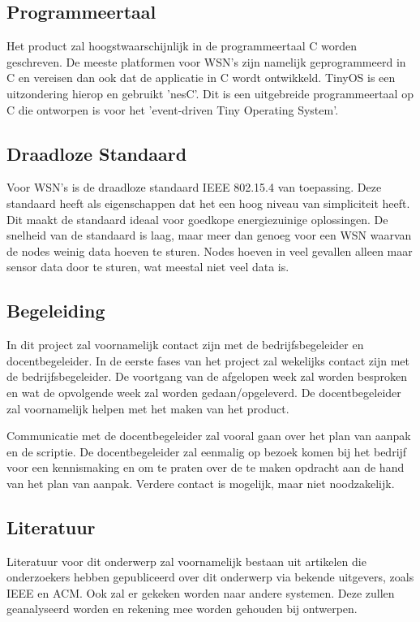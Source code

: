 \documentclass{../local}
\begin{document}
\subsection{Programmeertaal}
Het product zal hoogstwaarschijnlijk in de programmeertaal C worden geschreven. De meeste platformen voor WSN's zijn namelijk geprogrammeerd in C en vereisen dan ook dat de applicatie in C wordt ontwikkeld. TinyOS is een uitzondering hierop en gebruikt 'nesC'. Dit is een uitgebreide programmeertaal op C die ontworpen is voor het 'event-driven Tiny Operating System'.\cite{nesC}

\subsection{Draadloze Standaard}
Voor WSN's is de draadloze standaard IEEE 802.15.4 van toepassing. Deze standaard heeft als eigenschappen dat het een hoog niveau van simpliciteit heeft. Dit maakt de standaard ideaal voor goedkope energiezuinige oplossingen. De snelheid van de standaard is laag, maar meer dan genoeg voor een WSN waarvan de nodes weinig data hoeven te sturen. Nodes hoeven in veel gevallen alleen maar sensor data door te sturen, wat meestal niet veel data is.

\subsection{Begeleiding}
In dit project zal voornamelijk contact zijn met de bedrijfsbegeleider en docentbegeleider. In de eerste fases van het project zal wekelijks contact zijn met de bedrijfsbegeleider. De voortgang van de afgelopen week zal worden besproken en wat de opvolgende week zal worden gedaan/opgeleverd. De docentbegeleider zal voornamelijk helpen met het maken van het product.

Communicatie met de docentbegeleider zal vooral gaan over het plan van aanpak en de scriptie. De docentbegeleider zal eenmalig op bezoek komen bij het bedrijf voor een kennismaking en om te praten over de te maken opdracht aan de hand van het plan van aanpak. Verdere contact is mogelijk, maar niet noodzakelijk.

\subsection{Literatuur}
Literatuur voor dit onderwerp zal voornamelijk bestaan uit artikelen die onderzoekers hebben gepubliceerd over dit onderwerp via bekende uitgevers, zoals IEEE en ACM. Ook zal er gekeken worden naar andere systemen. Deze zullen geanalyseerd worden en rekening mee worden gehouden bij ontwerpen.
\end{document}
